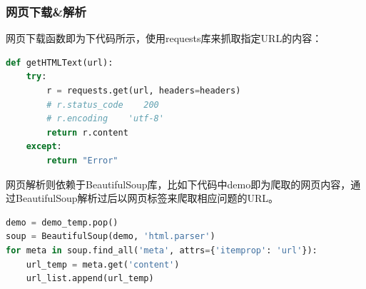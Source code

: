 \documentclass[UTF-8,a4paper, 12pt]{article}
\numberwithin{equation}{section}
\begin{document}
\subsubsection{网页下载\&解析}
网页下载函数即为下代码所示，使用requests库来抓取指定URL的内容：
\begin{lstlisting}[language=python]
def getHTMLText(url):
    try:
        r = requests.get(url, headers=headers)
        # r.status_code    200
        # r.encoding    'utf-8'
        return r.content
    except:
        return "Error"
\end{lstlisting}

网页解析则依赖于BeautifulSoup库，比如下代码中demo即为爬取的网页内容，通过BeautifulSoup解析过后以网页标签来爬取相应问题的URL。
\begin{lstlisting}[language=python]
demo = demo_temp.pop()
soup = BeautifulSoup(demo, 'html.parser')
for meta in soup.find_all('meta', attrs={'itemprop': 'url'}):
    url_temp = meta.get('content')
    url_list.append(url_temp)
\end{lstlisting}
\end{document}
